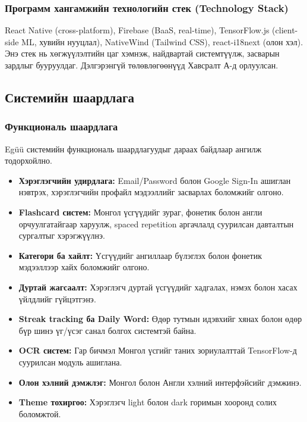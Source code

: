 \subsubsection{Программ хангамжийн технологийн стек (Technology Stack)}

React Native (cross-platform), Firebase (BaaS, real-time), TensorFlow.js (client-side ML, хувийн нууцлал), NativeWind (Tailwind CSS), react-i18next (олон хэл). Энэ стек нь хөгжүүлэлтийн цаг хэмнэж, найдвартай системтүүлж, засварын зардлыг бууруулдаг. Дэлгэрэнгүй төлөвлөгөөнүүд Хавсралт А-д орлуулсан.



\subsection{Системийн шаардлага}
\label{subsec:requirements}

\subsubsection{Функциональ шаардлага}

Egüü системийн функциональ шаардлагуудыг дараах байдлаар ангилж тодорхойлно.

\begin{itemize}
\item \textbf{Хэрэглэгчийн удирдлага:} Email/Password болон Google Sign-In ашиглан нэвтрэх, хэрэглэгчийн профайл мэдээллийг засварлах боломжийг олгоно.

\item \textbf{Flashcard систем:} Монгол үсгүүдийг зураг, фонетик болон англи орчуулгатайгаар харуулж, spaced repetition аргачлалд суурилсан давталтын сургалтыг хэрэгжүүлнэ.

\item \textbf{Категори ба хайлт:} Үсгүүдийг ангиллаар бүлэглэх болон фонетик мэдээллээр хайх боломжийг олгоно.

\item \textbf{Дуртай жагсаалт:} Хэрэглэгч дуртай үсгүүдийг хадгалах, нэмэх болон хасах үйлдлийг гүйцэтгэнэ.

\item \textbf{Streak tracking ба Daily Word:} Өдөр тутмын идэвхийг хянах болон өдөр бүр шинэ үг/үсэг санал болгох системтэй байна.

\item \textbf{OCR систем:} Гар бичмэл Монгол үсгийг таних зориулалттай TensorFlow-д суурилсан модуль ашиглана.

\item \textbf{Олон хэлний дэмжлэг:} Монгол болон Англи хэлний интерфэйсийг дэмжинэ.

\item \textbf{Theme тохиргоо:} Хэрэглэгч light болон dark горимын хооронд солих боломжтой.
\end{itemize}

